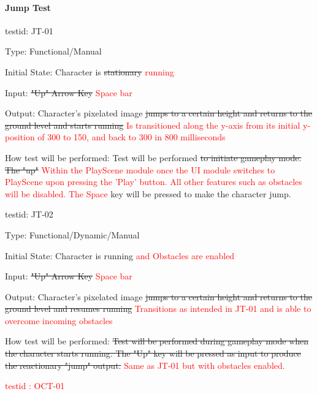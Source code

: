 \documentclass[12pt, titlepage]{article}
\begin{document}
\paragraph{Jump Test}

\begin{enumerate}

\item{testid: JT-01\\}

Type: Functional/Manual
					
Initial State: Character is \sout{stationary} \textcolor{red}{running}
					
Input: \sout{"Up" Arrow Key} \textcolor{red}{Space bar}
					
Output: Character's pixelated image \sout{jumps to a certain height and returns to the ground level and starts running} \textcolor{red}{Is transitioned along the y-axis from its initial y-position of 300 to 150, and back to 300 in 800 milliseconds}
					
How test will be performed: Test will be performed \sout{to initiate gameplay mode. The "up"} \textcolor{red}{Within the PlayScene module once the UI module switches to PlayScene upon pressing the 'Play' button. All other features such as obstacles will be disabled. The Space} key will be pressed to make the character jump. \\ 

\item{testid: JT-02\\}

Type: Functional/Dynamic/Manual
					
Initial State: Character is running \textcolor{red}{and Obstacles are enabled}
					
Input: \sout{"Up" Arrow Key} \textcolor{red}{Space bar}
					
Output: Character's pixelated image \sout{ jumps to a certain height and returns to the ground level and resumes running} \textcolor{red}{Transitions as intended in JT-01 and is able to overcome incoming obstacles}
					
How test will be performed: \sout{Test will be performed during gameplay mode when the character starts running. The "Up" key will be pressed as input to produce the reactionary "jump" output.} \textcolor{red}{Same as JT-01 but with obstacles enabled.} \\ 

\textcolor{red}{\item {testid : OCT-01}}


\end{enumerate}
\end{document}
